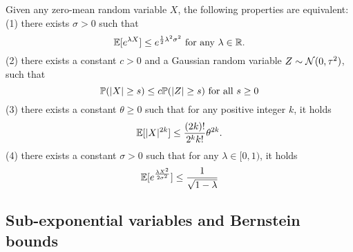 \begin{theorem} Given any zero-mean random variable $X$, the following properties are equivalent: \\
(1) there exists $\sigma>0$ such that \begin{equation*}{\mathbb{E}}[e^{\lambda X}]\le e^{\frac{1}{2}\lambda^2\sigma^2}\text{ for any } \lambda\in {\mathbb{R}}.\end{equation*}
(2) there exists a constant $c>0$ and a Gaussian random variable $Z\sim{\mathcal{N}}(0,\tau^2)$, such that 
\begin{equation*}
    {\mathbb{P}}(|X|\ge s) \le c{\mathbb{P}}(|Z|\ge s) \text{ for all } s\ge 0
\end{equation*}
(3) there exists a constant $\theta\ge 0$ such that for any positive integer $k$, it holds
\begin{equation*}
    {\mathbb{E}}[|X|^{2k}] \le \frac{(2k)!}{2^kk!}\theta^{2k}.
\end{equation*}
(4) there exists a constant $\sigma>0$ such that for any $\lambda\in[0,1)$, it holds
\begin{equation*}
    {\mathbb{E}}[e^{\frac{\lambda X^2}{2\sigma^2}}]\le \frac{1}{\sqrt{1-\lambda}}
\end{equation*}
\end{theorem}

\subsection{Sub-exponential variables and Bernstein bounds}
